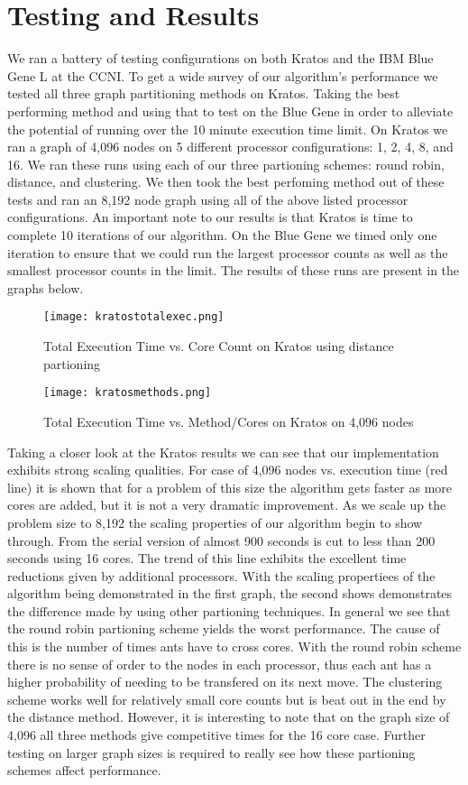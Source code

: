\documentclass{acm_proc_article-sp}
\begin{document}
\section{Testing and Results}
We ran a battery of testing configurations on both Kratos and the IBM Blue Gene L at the CCNI. To get a wide survey of our algorithm's performance we tested all three graph partitioning methods on Kratos. Taking the best
performing method and using that to test on the Blue Gene in order to alleviate the potential of running over the 10 minute execution time limit. On Kratos we ran a graph of 4,096 nodes on 5 different 
processor configurations: 1, 2, 4, 8, and 16. We ran these runs using each of our three partioning schemes: round robin, distance, and clustering. We then took the best perfoming method out of these tests
and ran an 8,192 node graph using all of the above listed processor configurations. An important note to our results is that Kratos is time to complete 10 iterations of our algorithm. On the Blue Gene we timed only one iteration to ensure that we could run the largest processor counts as well as the smallest processor counts in the limit. The results of these runs are present in the graphs below.

\begin{figure}[h!]
    \texttt{[image: kratostotalexec.png]}
    \caption{Total Execution Time vs. Core Count on Kratos using distance partioning}
\end{figure}

\begin{figure}[h!]
    \texttt{[image: kratosmethods.png]}
    \caption{Total Execution Time vs. Method/Cores on Kratos on 4,096 nodes}
\end{figure}

Taking a closer look at the Kratos results we can see that our implementation exhibits strong scaling qualities. For case of 4,096 nodes vs. execution time (red line) it is shown that for a problem of this size
the algorithm gets faster as more cores are added, but it is not a very dramatic improvement. As we scale up the problem size to 8,192 the scaling properties of our algorithm begin to show through. From the serial
version of almost 900 seconds is cut to less than 200 seconds using 16 cores. The trend of this line exhibits the excellent time reductions given by additional processors. With the scaling propertiees of the algorithm
being demonstrated in the first graph, the second shows demonstrates the difference made by using other partioning techniques. In general we see that the round robin partioning scheme yields the worst performance. The
cause of this is the number of times ants have to cross cores. With the round robin scheme there is no sense of order to the nodes in each processor, thus each ant has a higher probability of needing to be 
transfered on its next move. The clustering scheme works well for relatively small core counts but is beat out in the end by the distance method. However, it is interesting to note that on the graph size of 4,096 all
three methods give competitive times for the 16 core case. Further testing on larger graph sizes is required to really see how these partioning schemes affect performance.
\end{document}
